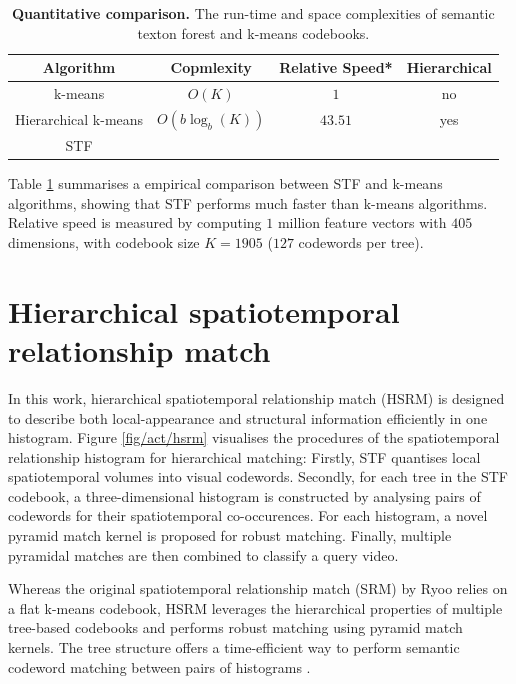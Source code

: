 \begin{table}
	\begin{center}
		\begin{tabular}{|c|c|c|c|}
			\hline
			\textbf{ Algorithm} & \textbf{ Copmlexity} & \textbf{ Relative Speed}* & \textbf{ Hierarchical} \\
			\hline
			k-means & $O(K)$ & $1$ & no \\
			Hierarchical k-means & $O(b\log_{b}(K))$ & $43.51$ & yes \\
			{STF} & \textbf{\color{blue}{ $ O(\log_{2}(K)) $ }} & \textbf{\color{blue}{$559.86$}} & \textbf{\color{blue}{yes}}\\
			\hline
		\end{tabular}
	\end{center}
	\caption{\textbf{Quantitative comparison.} The run-time and space complexities of semantic texton forest and k-means codebooks.}
	\label{tab/act/codebook}
\end{table}

Table \ref{tab/act/codebook} summarises a empirical comparison between STF and k-means algorithms, showing that STF performs much faster than k-means algorithms. Relative speed is measured by computing $1$ million feature vectors with $405$ dimensions, with codebook size $K = 1905$ ($127$ codewords per tree). 

\section{Hierarchical spatiotemporal relationship match}
\label{sec/act/HSRM}

In this work, hierarchical spatiotemporal relationship match (HSRM) is designed to describe both local-appearance and structural information efficiently in one histogram. 
Figure \ref{fig/act/hsrm} visualises the procedures of the spatiotemporal relationship histogram for hierarchical matching:   
Firstly, STF quantises local spatiotemporal volumes into visual codewords. 
Secondly, for each tree in the STF codebook, a three-dimensional histogram is constructed by analysing pairs of codewords for their spatiotemporal co-occurences. 
For each histogram, a novel pyramid match kernel is proposed for robust matching. 
Finally, multiple pyramidal matches are then combined to classify a query video. 

Whereas the original spatiotemporal relationship match (SRM) by Ryoo \etal \cite{Ryoo2009} relies on a flat k-means codebook, HSRM leverages the hierarchical properties of multiple tree-based codebooks and performs robust matching using pyramid match kernels. The tree structure offers a time-efficient way to perform semantic codeword matching between pairs of histograms \cite{Grauman2005}.

